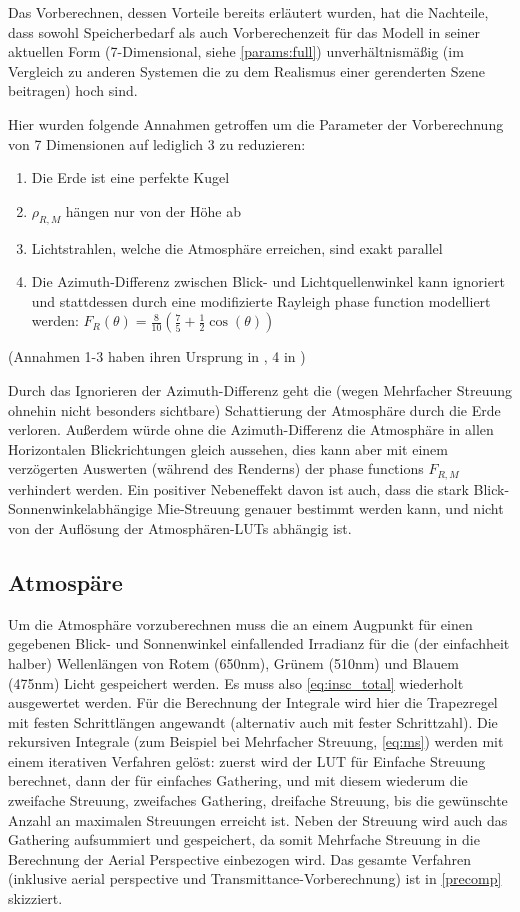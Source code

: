 Das Vorberechnen, dessen Vorteile bereits erläutert wurden, hat die Nachteile, dass sowohl Speicherbedarf als auch
Vorberechenzeit für das Modell in seiner aktuellen Form (7-Dimensional, siehe \cref{params:full})
unverhältnismäßig (im Vergleich zu anderen Systemen die zu dem Realismus einer gerenderten Szene beitragen) hoch sind.

Hier wurden folgende Annahmen getroffen um die Parameter der Vorberechnung von 7 Dimensionen auf lediglich 3 zu reduzieren:

\begin{enumerate}
	\item Die Erde ist eine perfekte Kugel
	\item $\rho_{R,M}$ hängen nur von der Höhe ab
	\item Lichtstrahlen, welche die Atmosphäre erreichen, sind exakt parallel
	\item Die Azimuth-Differenz zwischen Blick- und Lichtquellenwinkel kann ignoriert und stattdessen durch eine
	modifizierte Rayleigh phase function modelliert werden: $F_R(\theta) = \frac{8}{10}(\frac{7}{5}+\frac{1}{2}\cos(\theta))$
\end{enumerate}

(Annahmen 1-3 haben ihren Ursprung in \cite{Bruneton08}, 4 in \cite{Elek09})

Durch das Ignorieren der Azimuth-Differenz geht die (wegen Mehrfacher Streuung ohnehin nicht besonders sichtbare)
Schattierung der Atmosphäre durch die Erde verloren. Außerdem würde ohne die Azimuth-Differenz die Atmosphäre in allen
Horizontalen Blickrichtungen gleich aussehen, dies kann aber mit einem verzögerten Auswerten (während des Renderns) der
phase functions $F_{R,M}$ verhindert werden. Ein positiver Nebeneffekt davon ist auch, dass die stark
Blick-Sonnenwinkelabhängige Mie-Streuung genauer bestimmt werden kann, und nicht von der Auflösung der Atmosphären-LUTs
abhängig ist.


\subsection{Atmospäre}

Um die Atmosphäre vorzuberechnen muss die an einem Augpunkt für einen gegebenen Blick- und Sonnenwinkel einfallended
Irradianz für die (der einfachheit halber) Wellenlängen von Rotem (650nm), Grünem (510nm) und Blauem (475nm) Licht
gespeichert werden. Es muss also \cref{eq:insc_total} wiederholt ausgewertet werden. Für die Berechnung der
Integrale wird hier die Trapezregel mit festen Schrittlängen angewandt (alternativ auch mit fester Schrittzahl). Die
rekursiven Integrale (zum Beispiel bei Mehrfacher Streuung, \cref{eq:ms}) werden mit einem iterativen Verfahren
gelöst: zuerst wird der LUT für Einfache Streuung berechnet, dann der für einfaches Gathering, und mit diesem wiederum
die zweifache Streuung, zweifaches Gathering, dreifache Streuung, bis die gewünschte Anzahl an maximalen Streuungen
erreicht ist. Neben der Streuung wird auch das Gathering aufsummiert und gespeichert, da somit Mehrfache Streuung in die
Berechnung der Aerial Perspective einbezogen wird. Das gesamte Verfahren (inklusive aerial perspective und
Transmittance-Vorberechnung) ist in \cref{precomp} skizziert.

